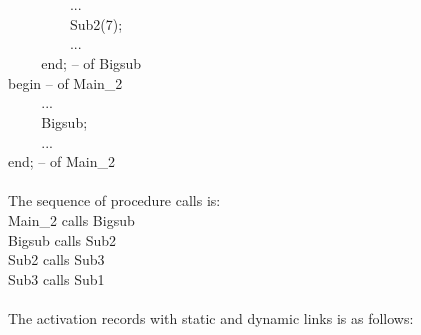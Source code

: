\documentclass[a4paper,12pt]{article}
\begin{document}
\verb+    +\verb+    +    ...\\
\verb+    +\verb+    +    Sub2(7);\\
\verb+    +\verb+    +    ...\\
\verb+    +  end; -- of Bigsub\\
  begin -- of Main\_2\\
\verb+    +  ...\\
\verb+    +  Bigsub;\\
\verb+    +  ...\\
end; -- of Main\_2\\
\\
The sequence of procedure calls is:\\
Main\_2 calls Bigsub\\
Bigsub calls Sub2\\
Sub2 calls Sub3\\
Sub3 calls Sub1\\
\\
The activation records with static and dynamic links is as follows:\\
\end{document}
